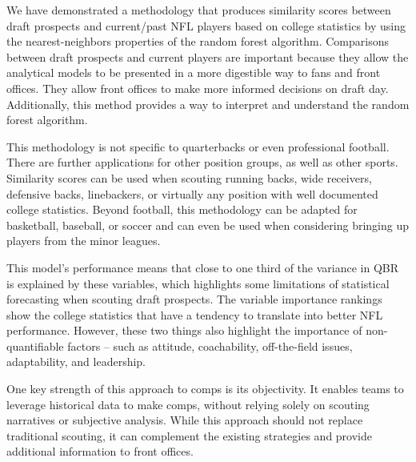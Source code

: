\documentclass{article}
\begin{document}
We have demonstrated a methodology that produces similarity scores between draft prospects and current/past NFL players based on college statistics by using the nearest-neighbors properties of the random forest algorithm. Comparisons between draft prospects and current players are important because they allow the analytical models to be presented in a more digestible way to fans and front offices. They allow front offices to make more informed decisions on draft day. Additionally, this method provides a way to interpret and understand the random forest algorithm.

This methodology is not specific to quarterbacks or even professional football. There are further applications for other position groups, as well as other sports. Similarity scores can be used when scouting running backs, wide receivers, defensive backs, linebackers, or virtually any position with well documented college statistics. Beyond football, this methodology can be adapted for basketball, baseball, or soccer and can even be used when considering bringing up players from the minor leagues.

This model's performance means that close to one third of the variance in QBR is explained by these variables, which highlights some limitations of statistical forecasting when scouting draft prospects. The variable importance rankings show the college statistics that have a tendency to translate into better NFL performance. However, these two things also highlight the importance of non-quantifiable factors – such as attitude, coachability, off-the-field issues, adaptability, and leadership.

One key strength of this approach to comps is its objectivity. It enables teams to leverage historical data to make comps, without relying solely on scouting narratives or subjective analysis. While this approach should not replace traditional scouting, it can complement the existing strategies and provide additional information to front offices. 


\end{document}
